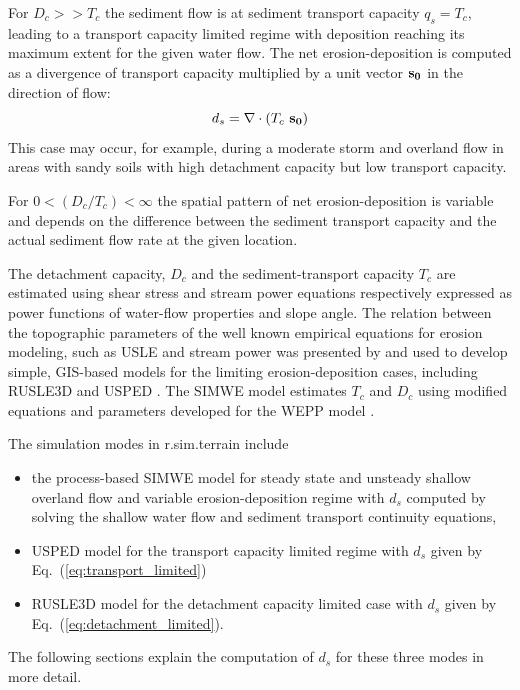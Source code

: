 \documentclass[gmd, manuscript]{copernicus}
\begin{document}
For  $D_c >> T_c$ the sediment flow is at sediment transport capacity $q_s = T_c$, 
leading to a transport capacity limited regime with deposition reaching its maximum
extent for the given water flow. The net erosion-deposition is computed as a divergence of
transport capacity multiplied by a unit vector ${\bf s_0}$ in the direction of flow:
\begin{equation}
\label{eq:transport_limited}
 d_s = \nabla\cdot (T_c ~ {\bf s_0})
\end{equation}
This case may occur, for example, during a moderate storm and overland flow in areas 
with sandy soils with high detachment capacity but low transport capacity.

For $0 < ({D_c / T_c}) < \infty$ the spatial pattern of net erosion-deposition is variable and depends on the 
difference between the sediment transport capacity and the actual sediment flow rate at the given location.

The detachment capacity, $D_c $  and the sediment-transport capacity $T_c $  
are estimated using shear stress and stream power equations respectively
expressed as power functions of water-flow properties and slope angle.    
The relation between the topographic parameters of the well known empirical equations for erosion modeling, such as USLE 
and stream power was presented by \citep{Moore1986} and used to develop
simple, GIS-based models for the limiting erosion-deposition cases, including RUSLE3D and USPED \citep{Mitasova2001}.
The SIMWE model estimates $T_c$ and $D_c$ using modified 
equations and parameters developed for the WEPP model \citep{Flanagan2013,Mitasova2001}.

The simulation modes in r.sim.terrain include 
\begin{itemize}
  \item the process-based SIMWE model for steady state and unsteady shallow overland flow 
   and variable erosion-deposition regime with $d_s$ computed 
   by solving the shallow water flow and sediment transport continuity equations,
  \item USPED model for the transport capacity limited regime with $d_s$ given by Eq.~(\ref{eq:transport_limited})
  \item RUSLE3D model for the detachment capacity limited case with $d_s$ given by Eq.~(\ref{eq:detachment_limited}). 
\end{itemize}
The following sections explain the computation of $d_s$ for these three modes in more detail.
\end{document}
